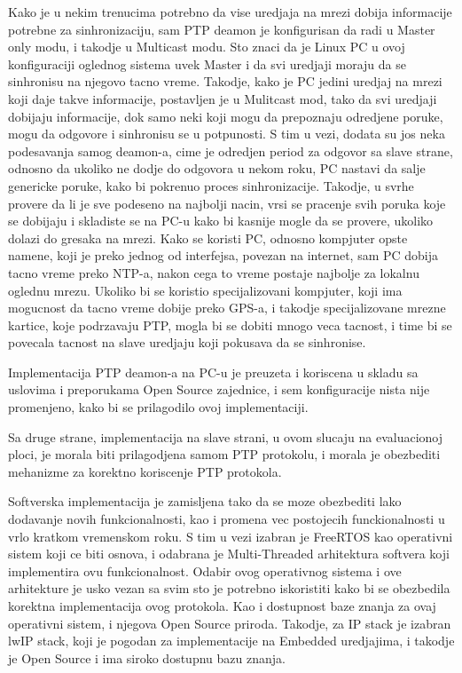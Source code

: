 \documentclass[a4paper,12pt, master]{etf}
\begin{document}
    Kako je u nekim trenucima potrebno da vise uredjaja na mrezi dobija informacije potrebne za 
    sinhronizaciju, sam PTP deamon je konfigurisan da radi u Master only modu, i takodje u Multicast modu. 
    Sto znaci da je Linux PC u ovoj konfiguraciji oglednog sistema uvek Master i da svi uredjaji moraju da se 
    sinhronisu na njegovo tacno vreme. Takodje, kako je PC jedini uredjaj na mrezi koji daje takve 
    informacije, postavljen je u Mulitcast mod, tako da svi uredjaji dobijaju informacije, dok samo neki koji 
    mogu da prepoznaju odredjene poruke, mogu da odgovore i sinhronisu se u potpunosti. S tim u vezi, dodata 
    su jos neka podesavanja samog deamon-a, cime je odredjen period za odgovor sa slave strane, odnosno da 
    ukoliko ne dodje do odgovora u nekom roku, PC nastavi da salje genericke poruke, kako bi pokrenuo proces 
    sinhronizacije. Takodje, u svrhe provere da li je sve podeseno na najbolji nacin, vrsi se pracenje svih 
    poruka koje se dobijaju i skladiste se na PC-u kako bi kasnije mogle da se provere, ukoliko dolazi do 
    gresaka na mrezi. Kako se koristi PC, odnosno kompjuter opste namene, koji je preko jednog od interfejsa, 
    povezan na internet, sam PC dobija tacno vreme preko NTP-a, nakon cega to vreme postaje najbolje za 
    lokalnu oglednu mrezu. Ukoliko bi se koristio specijalizovani kompjuter, koji ima mogucnost da tacno 
    vreme dobije preko GPS-a, i takodje specijalizovane mrezne kartice, koje podrzavaju PTP, mogla bi se 
    dobiti mnogo veca tacnost, i time bi se povecala tacnost na slave uredjaju koji pokusava da se sinhronise.

    Implementacija PTP deamon-a na PC-u je preuzeta i koriscena u skladu sa uslovima i preporukama Open 
    Source zajednice, i sem konfiguracije nista nije promenjeno, kako bi se prilagodilo ovoj implementaciji.

    Sa druge strane, implementacija na slave strani, u ovom slucaju na evaluacionoj ploci, je morala biti 
    prilagodjena samom PTP protokolu, i morala je obezbediti mehanizme za korektno koriscenje PTP protokola.

    Softverska implementacija je zamisljena tako da se moze obezbediti lako dodavanje novih funkcionalnosti, 
    kao i promena vec postojecih funckionalnosti u vrlo kratkom vremenskom roku. S tim u vezi izabran je 
    FreeRTOS kao operativni sistem koji ce biti osnova, i odabrana je Multi-Threaded arhitektura softvera 
    koji implementira ovu funkcionalnost. Odabir ovog operativnog sistema i ove arhitekture je usko vezan sa 
    svim sto je potrebno iskoristiti kako bi se obezbedila korektna implementacija ovog protokola. Kao i 
    dostupnost baze znanja za ovaj operativni sistem, i njegova Open Source priroda. Takodje, za IP stack je 
    izabran lwIP stack, koji je pogodan za implementacije na Embedded uredjajima, i takodje je Open Source i 
    ima siroko dostupnu bazu znanja.
\end{document}
